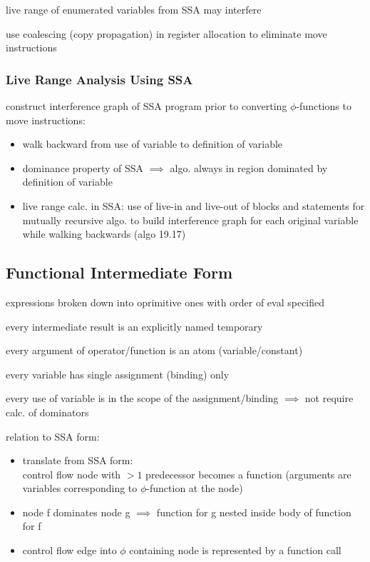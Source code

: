 \documentclass[8pt]{extarticle}
\begin{document}
\begin{multicols*}{2}
  live range of enumerated variables from SSA may interfere

  use coalescing (copy propagation) in register allocation to eliminate move instructions

  \subsubsection{Live Range Analysis Using SSA}

  construct interference graph of SSA program prior to converting $\phi$-functions to move instructions:
  \begin{itemize}
  \item walk backward from use of variable to definition of variable
  \item dominance property of SSA $\implies$ algo. always in region dominated by definition of variable
  \item live range calc. in SSA: use of live-in and live-out of blocks and statements for mutually recursive algo. to build interference graph for each original variable while walking backwards (algo 19.17)
  \end{itemize}

  \subsection{Functional Intermediate Form}
  expressions broken down into oprimitive ones with order of eval specified

  every intermediate result is an explicitly named temporary

  every argument of operator/function is an atom (variable/constant)

  every variable has single assignment (binding) only

  every use of variable is in the scope of the assignment/binding $\implies$ not require calc. of dominators

  relation to SSA form:
  \begin{itemize}
  \item translate from SSA form:\\
    control flow node with $>1$ predecessor becomes a function (arguments are variables corresponding to $\phi$-function at the node)
  \item node f dominates node g $\implies$ function for g nested inside body of function for f
  \item control flow edge into $\phi$ containing node is represented by a function call
  \end{itemize}
  

\end{multicols*}
\end{document}
